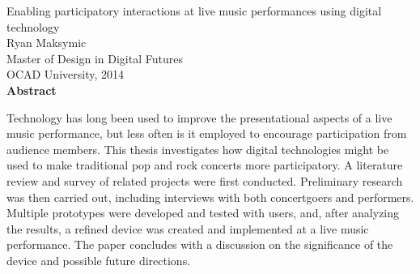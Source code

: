 \begin{center}
{Enabling participatory interactions at live music performances using digital technology\\[0.25cm]
Ryan Maksymic\\[0.25cm]
Master of Design in Digital Futures\\[0.25cm]
OCAD University, 2014\\[0.75cm]
\large\textbf{Abstract}}\\
\end{center}

Technology has long been used to improve the presentational aspects of a live music performance, but less often is it employed to encourage participation from audience members. This thesis investigates how digital technologies might be used to make traditional pop and rock concerts more participatory. A literature review and survey of related projects were first conducted. Preliminary research was then carried out, including interviews with both concertgoers and performers. Multiple prototypes were developed and tested with users, and, after analyzing the results, a refined device was created and implemented at a live music performance. The paper concludes with a discussion on the significance of the device and possible future directions.




